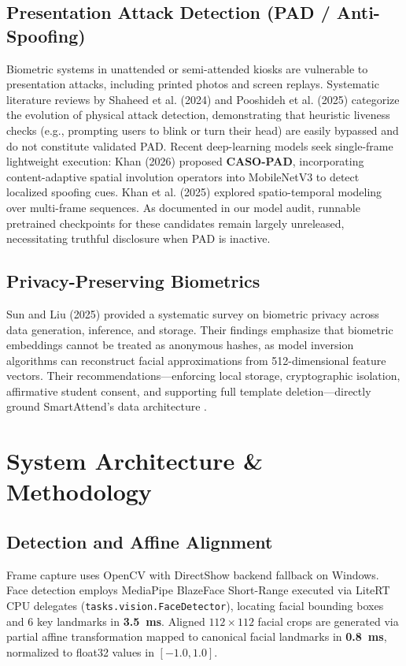 \documentclass[conference]{IEEEtran}
\begin{document}
\subsection{Presentation Attack Detection (PAD / Anti-Spoofing)}
Biometric systems in unattended or semi-attended kiosks are vulnerable to presentation attacks, including printed photos and screen replays. Systematic literature reviews by Shaheed et al. (2024) \cite{shaheed2024deep} and Pooshideh et al. (2025) \cite{pooshideh2025pad} categorize the evolution of physical attack detection, demonstrating that heuristic liveness checks (e.g., prompting users to blink or turn their head) are easily bypassed and do not constitute validated PAD. Recent deep-learning models seek single-frame lightweight execution: Khan (2026) \cite{khan2026casopad} proposed \textbf{CASO-PAD}, incorporating content-adaptive spatial involution operators into MobileNetV3 to detect localized spoofing cues. Khan et al. (2025) \cite{khan2025spatiotemporal} explored spatio-temporal modeling over multi-frame sequences. As documented in our model audit, runnable pretrained checkpoints for these candidates remain largely unreleased, necessitating truthful disclosure when PAD is inactive.

\subsection{Privacy-Preserving Biometrics}
Sun and Liu (2025) \cite{sun2025privacy} provided a systematic survey on biometric privacy across data generation, inference, and storage. Their findings emphasize that biometric embeddings cannot be treated as anonymous hashes, as model inversion algorithms can reconstruct facial approximations from 512-dimensional feature vectors. Their recommendations---enforcing local storage, cryptographic isolation, affirmative student consent, and supporting full template deletion---directly ground SmartAttend's data architecture \cite{zhou2024privacy, chen2025leakages}.

\section{System Architecture \& Methodology}

\subsection{Detection and Affine Alignment}
Frame capture uses OpenCV with DirectShow backend fallback on Windows. Face detection employs MediaPipe BlazeFace Short-Range executed via LiteRT CPU delegates (\texttt{tasks.vision.FaceDetector}), locating facial bounding boxes and 6 key landmarks in \textbf{3.5~ms}. Aligned $112\times 112$ facial crops are generated via partial affine transformation mapped to canonical facial landmarks in \textbf{0.8~ms}, normalized to float32 values in $[-1.0, 1.0]$.
\end{document}
